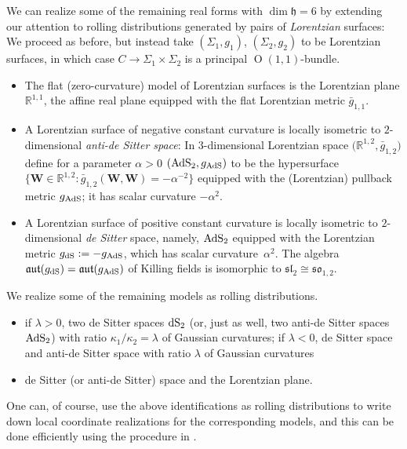 \documentclass[10pt,a4paper]{amsart}
\newcommand{\bbR}{\mathbb{R}}
\newcommand{\mbW}{\mathbf{W}}
\newcommand{\mfh} {\mathfrak{h}}
\newcommand{\mfaut}{\mathfrak{aut}}
\newcommand{\mfsl} {\mathfrak{sl}}
\newcommand{\mfso} {\mathfrak{so}}
\numberwithin{equation}{section}
\begin{document}
 We can realize some of the remaining real forms with $\dim \mfh = 6$ by extending our attention to rolling distributions generated by pairs of \textit{Lorentzian} surfaces: We proceed as before, but instead take $(\Sigma_1, g_1)$, $(\Sigma_2, g_2)$ to be Lorentzian surfaces, in which case $C \to \Sigma_1 \times \Sigma_2$ is a principal $\operatorname{O}(1, 1)$-bundle.
\begin{itemize}\itemsep=0pt
 \item The flat (zero-curvature) model of Lorentzian surfaces is the Lorentzian plane $\bbR^{1, 1}$, the affine real plane equipped with the flat Lorentzian metric $\bar g_{1, 1}$.
 \item A Lorentzian surface of negative constant curvature is locally isometric to $2$-dimensional \textit{anti-de Sitter space}: In $3$-dimensional Lorentzian space $\big(\bbR^{1, 2}, \bar g_{1, 2}\big)$ define for a parameter $\alpha > 0$ $({\rm AdS}_2, g_{{\rm AdS}})$ to be the hypersurface $\big\{\mbW \in \bbR^{1, 2} \colon \bar g_{1, 2}(\mbW, \mbW) = -\alpha^{-2} \big\}$ equipped with the (Lorentzian) pullback metric $g_{{\rm AdS}}$; it has scalar curvature $-\alpha^2$.
 \item A Lorentzian surface of positive constant curvature is locally isometric to $2$-dimensional \textit{de Sitter} space, namely, ${\rm AdS}_2$ equipped with the Lorentzian metric $g_{{\rm dS}} := -g_{{\rm AdS}}$, which has scalar curvature~$\alpha^2$. The algebra $\mfaut(g_{{\rm dS}}) = \mfaut(g_{{\rm AdS}})$ of Killing fields is isomorphic to $\mfsl_2 \cong \mfso_{1, 2}$.
\end{itemize}

We realize some of the remaining models as rolling distributions.
\begin{itemize}[leftmargin=1.5cm]\itemsep=0pt
	\item[$\mathbf{D.6}_{\lambda}^{2-}$] if $\lambda > 0$, two de Sitter spaces ${\rm dS}_2$ (or, just as well, two anti-de Sitter spaces ${\rm AdS}_2$) with ratio $\kappa_1 / \kappa_2 = \lambda$ of Gaussian curvatures; if $\lambda < 0$, de Sitter space and anti-de Sitter space with ratio $\lambda$ of Gaussian curvatures \item[$\mathbf{D.6}_{\infty}^1$] de Sitter (or anti-de Sitter) space and the Lorentzian plane.
\end{itemize}

One can, of course, use the above identifications as rolling distributions to write down local coordinate realizations for the corresponding models, and this can be done efficiently using the procedure in \cite[Section~2]{AnNurowski}.
\end{document}
